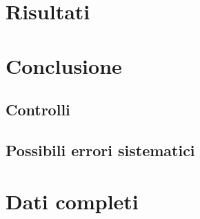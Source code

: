 \documentclass[italian, a4paper, 10pt, twocolumn]{../../style/lab_unige}
\begin{document}
    \section{Risultati}
    \label{section:results}


    \section{Conclusione}
    \label{section:conclusion}

    \subsection{Controlli}

    \subsection{Possibili errori sistematici}
    
    \appendix

    \section{Dati completi}
\end{document}
